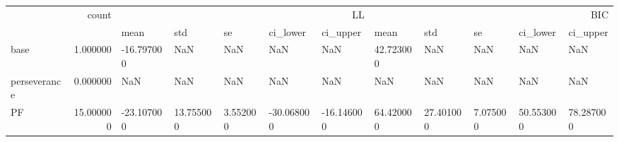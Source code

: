 \begin{tabular}{lrllllllllll}
\toprule
 & count & \multicolumn{5}{r}{LL} & \multicolumn{5}{r}{BIC} \\
 &  & mean & std & se & ci_lower & ci_upper & mean & std & se & ci_lower & ci_upper \\
\midrule
base & 1.000000 & -16.797000 & NaN & NaN & NaN & NaN & 42.723000 & NaN & NaN & NaN & NaN \\
perseverance & 0.000000 & NaN & NaN & NaN & NaN & NaN & NaN & NaN & NaN & NaN & NaN \\
PF & 15.000000 & -23.107000 & 13.755000 & 3.552000 & -30.068000 & -16.146000 & 64.420000 & 27.401000 & 7.075000 & 50.553000 & 78.287000 \\
\bottomrule
\end{tabular}
